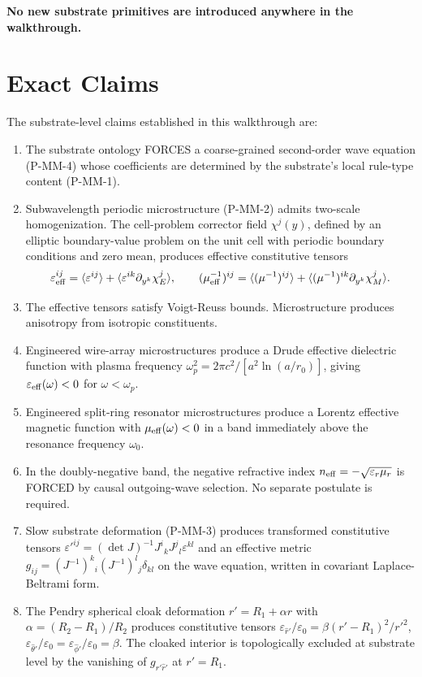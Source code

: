 \documentclass[11pt,a4paper]{article}
\begin{document}
\textbf{No new substrate primitives are introduced anywhere in the walkthrough.}

\section{Exact Claims}

The substrate-level claims established in this walkthrough are:

\begin{enumerate}[noitemsep]
\item The substrate ontology FORCES a coarse-grained second-order wave equation (P-MM-4) whose coefficients are determined by the substrate's local rule-type content (P-MM-1).
\item Subwavelength periodic microstructure (P-MM-2) admits two-scale homogenization. The cell-problem corrector field $\chi^j(y)$, defined by an elliptic boundary-value problem on the unit cell with periodic boundary conditions and zero mean, produces effective constitutive tensors
\[
\varepsilon_{\rm eff}^{ij} = \langle\varepsilon^{ij}\rangle + \langle\varepsilon^{ik}\partial_{y^k}\chi_E^j\rangle, \qquad (\mu_{\rm eff}^{-1})^{ij} = \langle(\mu^{-1})^{ij}\rangle + \langle(\mu^{-1})^{ik}\partial_{y^k}\chi_M^j\rangle.
\]
\item The effective tensors satisfy Voigt-Reuss bounds. Microstructure produces anisotropy from isotropic constituents.
\item Engineered wire-array microstructures produce a Drude effective dielectric function with plasma frequency $\omega_p^2 = 2\pi c^2/[a^2\ln(a/r_0)]$, giving $\varepsilon_{\rm eff}(\omega) < 0$ for $\omega < \omega_p$.
\item Engineered split-ring resonator microstructures produce a Lorentz effective magnetic function with $\mu_{\rm eff}(\omega) < 0$ in a band immediately above the resonance frequency $\omega_0$.
\item In the doubly-negative band, the negative refractive index $n_{\rm eff} = -\sqrt{\varepsilon_r\mu_r}$ is FORCED by causal outgoing-wave selection. No separate postulate is required.
\item Slow substrate deformation (P-MM-3) produces transformed constitutive tensors $\varepsilon'^{ij} = (\det J)^{-1} J^i{}_k J^j{}_l \varepsilon^{kl}$ and an effective metric $g_{ij} = (J^{-1})^k{}_i (J^{-1})^l{}_j \delta_{kl}$ on the wave equation, written in covariant Laplace-Beltrami form.
\item The Pendry spherical cloak deformation $r' = R_1 + \alpha r$ with $\alpha = (R_2 - R_1)/R_2$ produces constitutive tensors $\varepsilon_{\hat r'}/\varepsilon_0 = \beta(r' - R_1)^2/r'^2$, $\varepsilon_{\hat\theta'}/\varepsilon_0 = \varepsilon_{\hat\phi'}/\varepsilon_0 = \beta$. The cloaked interior is topologically excluded at substrate level by the vanishing of $g_{\hat r'\hat r'}$ at $r' = R_1$.

\end{enumerate}
\end{document}
